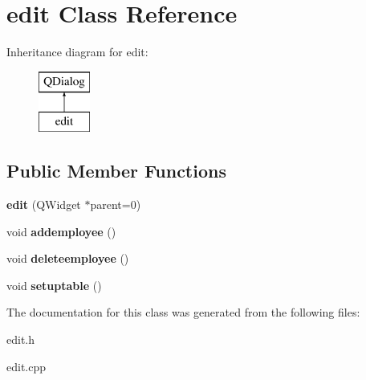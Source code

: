 \hypertarget{classedit}{}\section{edit Class Reference}
\label{classedit}
Inheritance diagram for edit\+:\begin{figure}[H]
\begin{center}
\leavevmode
\includegraphics[height=2.000000cm]{classedit}
\end{center}
\end{figure}
\subsection*{Public Member Functions}
\begin{DoxyCompactItemize}
\item 
\hypertarget{classedit_a5eb3bc1268962c3352f3b3de164daeac}{}\label{classedit_a5eb3bc1268962c3352f3b3de164daeac} 
{\bfseries edit} (Q\+Widget $\ast$parent=0)
\item 
\hypertarget{classedit_adabb1ab89e251396613f548859401408}{}\label{classedit_adabb1ab89e251396613f548859401408} 
void {\bfseries addemployee} ()
\item 
\hypertarget{classedit_afeae840fba36b9ae5bab7937093666ae}{}\label{classedit_afeae840fba36b9ae5bab7937093666ae} 
void {\bfseries deleteemployee} ()
\item 
\hypertarget{classedit_a4d28ed1ecb81b8a9a0a3fbcd15503094}{}\label{classedit_a4d28ed1ecb81b8a9a0a3fbcd15503094} 
void {\bfseries setuptable} ()
\end{DoxyCompactItemize}


The documentation for this class was generated from the following files\+:\begin{DoxyCompactItemize}
\item 
edit.\+h\item 
edit.\+cpp\end{DoxyCompactItemize}
